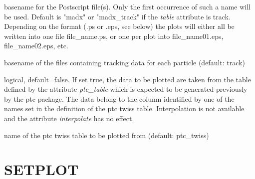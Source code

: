 \begin{madlist}
    basename for the Postscript
     file(s). Only the first occurrence of such a name will be
     used. Default is "madx" or "madx\_track" if the \textit{table}
     attribute is track.  Depending on the format (.ps or .eps, see
     below) the plots will either all be written into one file
     file\_name.ps, or one per plot into file\_name01.eps,
     file\_name02.eps, etc.   

    basename of the files containing
     tracking data for each particle (default: track)  

    logical, default=false. If set true, the data to be
     plotted are taken from the table defined by the attribute
     \textit{ptc\_table} which is expected to be generated previously by
     the ptc package. The data belong to the column identified by one of
     the names set in the definition of the ptc twiss
     table. Interpolation is not available and the attribute
     \textit{interpolate} has no effect.   

    name of the ptc twiss table to be plotted from
     (default: ptc\_twiss)  

\end{madlist}



\section{SETPLOT}
\label{sec:setplot}

